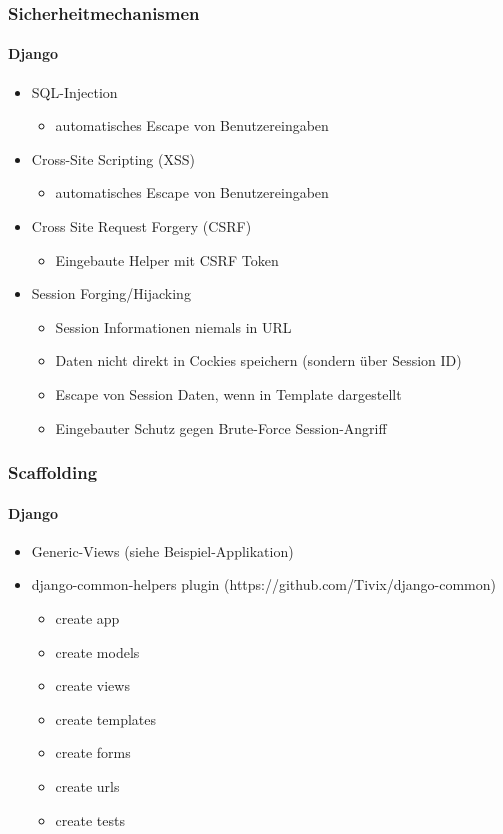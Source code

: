 \documentclass[
    t,
    smaller,
    compress,
    xcolor=svgnames,            %
    table,
]{beamer}
\begin{document}
\begin{frame}
  \frametitle{Sicherheitmechanismen}
\framesubtitle{Django}
  \begin{itemize}[<1->]
    \item SQL-Injection
            \begin{itemize}[<1->]
                \item automatisches Escape von Benutzereingaben
            \end{itemize}
    \item Cross-Site Scripting (XSS)
    \begin{itemize}[<1->]
                \item automatisches Escape von Benutzereingaben
            \end{itemize}
    \item Cross Site Request Forgery (CSRF)
         \begin{itemize}[<1->]
                \item Eingebaute Helper mit CSRF Token
            \end{itemize}
    \item Session Forging/Hijacking
    \begin{itemize}[<1->]
                \item Session Informationen niemals in URL
                \item Daten nicht direkt in Cockies speichern (sondern \"uber Session ID)
                \item Escape von Session Daten, wenn in Template dargestellt
                \item Eingebauter Schutz gegen Brute-Force Session-Angriff
            \end{itemize}
    \end{itemize}

\end{frame}


\begin{frame}[fragile]
  \frametitle{Scaffolding}
\framesubtitle{Django}
 \begin{itemize}[<1->]
     \item Generic-Views (siehe Beispiel-Applikation)
    \item django-common-helpers plugin (https://github.com/Tivix/django-common)
    \begin{itemize}[<1->]
    \item create app
    \item create models
    \item create views
    \item create templates
    \item create forms
    \item create urls
    \item create tests
    \end{itemize}

 \end{itemize}
    \vspace{15pt}


\end{frame}
\end{document}
